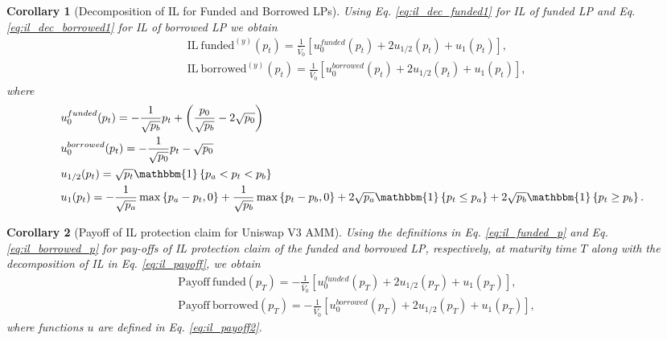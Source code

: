 \documentclass[pdftex,11pt,a4paper] {article}
\newtheorem{corollary}{Corollary}[section]
\begin{document}
\begin{corollary}[Decomposition of IL for Funded and Borrowed LPs]
Using Eq. \eqref{eq:il_dec_funded1} for IL of funded LP and Eq. %
\eqref{eq:il_dec_borrowed1} for IL of borrowed LP we obtain
\begin{equation}  \label{eq:il_payoff}
\begin{split}
& \mathrm{IL \ funded}^{(y)}(p_{t}) = \frac{1}{\bar{V}_{0}}\left[u^{funded}_{0}(p_{t}) + 2u_{1/2}(p_{t}) +
u_{1}(p_{t})\right], \\
& \mathrm{IL \ borrowed}^{(y)}(p_{t}) = \frac{1}{\bar{V}_{0}}\left[u^{borrowed}_{0}(p_{t}) + 2u_{1/2}(p_{t}) +
u_{1}(p_{t})\right],
\end{split}%
\end{equation}
where
\begin{equation}  \label{eq:il_payoff2}
\begin{split}
& u^{funded}_{0}(p_{t}) = - \frac{1}{\sqrt{p_{b}}} p_{t} + \left(\frac{p_{0}%
}{\sqrt{p_{b}}}-2\sqrt{p_{0}}\right) \\
& u^{borrowed}_{0}(p_{t}) = - \frac{1}{\sqrt{p_{0}}} p_{t} - \sqrt{p_{0}} \\
& u_{1/2}(p_{t}) = \sqrt{p_{t}} \mathbbm{1}\left\{ p_{a} < p_{t} <
p_{b}\right\} \\
& u_{1}(p_{t}) = -\frac{1}{\sqrt{p_{a}}} \max\left\{ p_{a}-p_{t}, 0\right\}
+ \frac{1}{\sqrt{p_{b}}} \max\left\{ p_{t}-p_{b}, 0\right\} + 2\sqrt{p_{a}} %
\mathbbm{1}\left\{p_{t}\leq p_{a}\right\} + 2\sqrt{p_{b}}\mathbbm{1}%
\left\{p_{t} \geq p_{b}\right\}.
\end{split}%
\end{equation}
\end{corollary}

\begin{corollary}[Payoff of IL protection claim for Uniswap V3 AMM]
Using the definitions in Eq. \eqref{eq:il_funded_p} and Eq. %
\eqref{eq:il_borrowed_p} for pay-offs of IL protection claim of the funded and
borrowed LP, respectively, at maturity time $T$ along with the decomposition of
IL in Eq. \eqref{eq:il_payoff}, we obtain
\begin{equation}  \label{eq:il_payoff3}
\begin{split}
& \mathrm{Payoff \ funded}(p_{T}) = - \frac{1}{\bar{V}_{0}}\left[u^{funded}_{0}(p_{T}) + 2u_{1/2}(p_{T}) +
u_{1}(p_{T})\right], \\
& \mathrm{Payoff \ borrowed}(p_{T}) = - \frac{1}{\bar{V}_{0}}\left[u^{borrowed}_{0}(p_{T}) +
2u_{1/2}(p_{T}) + u_{1}(p_{T})\right],
\end{split}%
\end{equation}
where functions $u$ are defined in Eq. \eqref{eq:il_payoff2}.
\end{corollary}
\end{document}
